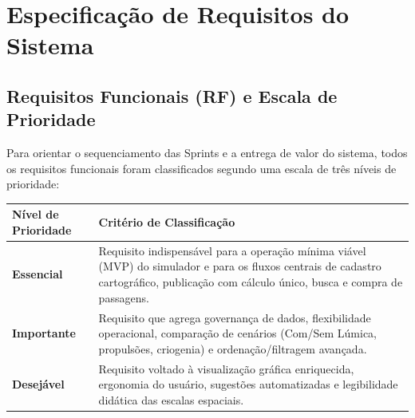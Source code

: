 \documentclass[12pt, a4paper]{article}
\begin{document}
\section{Especificação de Requisitos do Sistema}

\subsection{Requisitos Funcionais (RF) e Escala de Prioridade}
Para orientar o sequenciamento das Sprints e a entrega de valor do sistema, todos os requisitos funcionais foram classificados segundo uma escala de três níveis de prioridade:

\begin{table}[H]
\centering
\renewcommand{\arraystretch}{1.25}
\begin{tabularx}{\textwidth}{>{\bfseries}l X}
\toprule
Nível de Prioridade & Critério de Classificação \\
\midrule
Essencial & Requisito indispensável para a operação mínima viável (MVP) do simulador e para os fluxos centrais de cadastro cartográfico, publicação com cálculo único, busca e compra de passagens. \\
Importante & Requisito que agrega governança de dados, flexibilidade operacional, comparação de cenários (Com/Sem Lúmica, propulsões, criogenia) e ordenação/filtragem avançada. \\
Desejável & Requisito voltado à visualização gráfica enriquecida, ergonomia do usuário, sugestões automatizadas e legibilidade didática das escalas espaciais. \\
\bottomrule
\end{tabularx}
\end{table}
\end{document}
